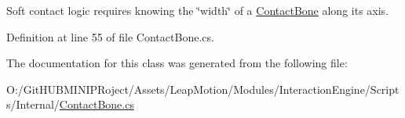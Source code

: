Soft contact logic requires knowing the \char`\"{}width\char`\"{} of a \mbox{\hyperlink{class_leap_1_1_unity_1_1_interaction_1_1_contact_bone}{Contact\+Bone}} along its axis. 



Definition at line 55 of file Contact\+Bone.\+cs.



The documentation for this class was generated from the following file\+:\begin{DoxyCompactItemize}
\item 
O\+:/\+Git\+H\+U\+B\+M\+I\+N\+I\+P\+Roject/\+Assets/\+Leap\+Motion/\+Modules/\+Interaction\+Engine/\+Scripts/\+Internal/\mbox{\hyperlink{_contact_bone_8cs}{Contact\+Bone.\+cs}}\end{DoxyCompactItemize}
